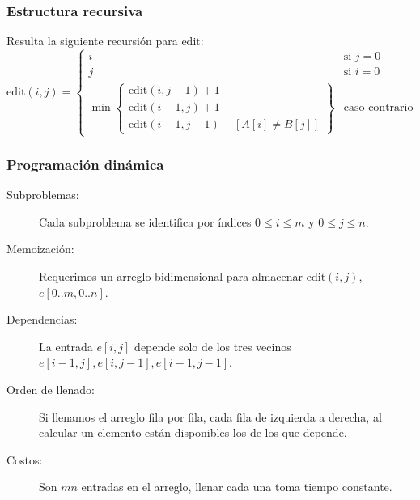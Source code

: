 \documentclass[english, spanish, fleqn,%
hyperref = {colorlinks, urlcolor = blue}%
]{beamer}
\begin{document}
\begin{frame}
  \setcounter{beamerpauses}{2}
  \frametitle{Estructura recursiva}

  Resulta la siguiente recursión para \(\mathrm{edit}\):
  \begin{equation*}
    \mathrm{edit}(i, j)
      = \begin{cases}
           i & \text{si \(j = 0\)} \\
           j & \text{si \(i = 0\)} \\
           \min
             \begin{Bmatrix}
               \mathrm{edit}(i, j - 1) + 1 \\
               \mathrm{edit}(i - 1, j) + 1 \\
               \mathrm{edit}(i - 1, j - 1) + [A[i] \ne B[j]]
             \end{Bmatrix}
             & \text{caso contrario}
        \end{cases}
  \end{equation*}
\end{frame}

\begin{frame}
  \setcounter{beamerpauses}{2}
  \frametitle{Programación dinámica}

  \begin{description}
  \item[Subproblemas:]
    Cada subproblema se identifica
    por índices \(0 \le i \le m\) y \(0 \le j \le n\).
  \item[Memoización:]
    Requerimos un arreglo bidimensional
    para almacenar \(\mathrm{edit}(i, j)\),
    \(e[0 .. m, 0 .. n]\).
  \item[Dependencias:]
    La entrada \(e[i, j]\) depende solo de los tres vecinos
    \(e[i - 1, j], e[i, j - 1], e[i - 1, j - 1]\).
  \item[Orden de llenado:]
    Si llenamos el arreglo fila por fila,
    cada fila de izquierda a derecha,
    al calcular un elemento están disponibles los de los que depende.
  \item[Costos:]
    Son \(m n\) entradas en el arreglo,
    llenar cada una toma tiempo constante.
  \end{description}
\end{frame}
\end{document}
